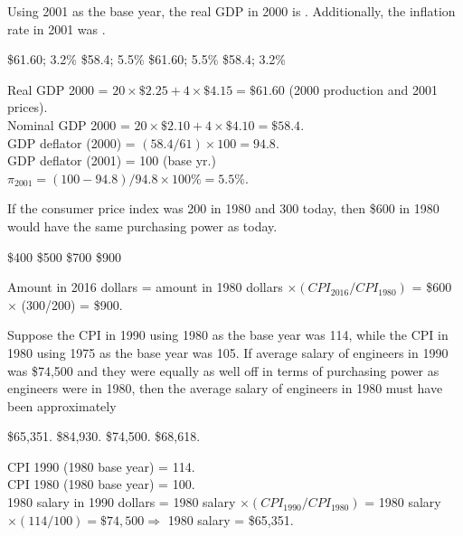 \documentclass[addpoints,11pt]{exam}
\theoremstyle{definition}
\newcommand{\blank}[0]{\underline{\hspace{3cm}}}
\begin{document}
\begin{questions}
			Using 2001 as the base year, the real GDP in 2000 is \blank. Additionally, the inflation rate in 2001 was \blank.
			
			\begin{choices}
				\choice \$61.60; 3.2\%
				\choice \$58.4; 5.5\%
				\CorrectChoice \$61.60; 5.5\%
				\choice \$58.4; 3.2\%
			\end{choices}
			
			\begin{solution}
				Real GDP 2000 = $20 \times \$2.25 + 4 \times \$4.15 = \$61.60$ (2000 production and 2001 prices). \\
				Nominal GDP 2000 = $20 \times \$2.10 + 4\times \$4.10 = \$58.4$. \\ GDP deflator (2000) = $(58.4/61)\times 100 = 94.8$. \\
				GDP deflator (2001) = 100 (base yr.) \\
				$\pi_{2001} = (100-94.8)/94.8\times 100\% = 5.5\%$.
			\end{solution}
			

			\question If the consumer price index was 200 in 1980 and 300 today, then \$600 in 1980 would have the same purchasing power as \blank today.
			
			\begin{choices}
				\choice \$400
				\choice \$500
				\choice \$700
				\CorrectChoice \$900
			\end{choices}
			
		\begin{solution}
			Amount in 2016 dollars = amount in 1980 dollars $\times (CPI_{2016}/CPI_{1980})$ = \$600 $\times$ (300/200) = \$900.
		\end{solution}

		\question Suppose the CPI in 1990 using 1980 as the base year was 114, while the CPI in 1980 using 1975 as the base year was 105. If average salary of engineers in 1990 was \$74,500 and they were equally as well off in terms of purchasing power as engineers were in 1980, then the average salary of engineers in 1980 must have been approximately
		
		\begin{choices}
			\CorrectChoice \$65,351.
			\choice \$84,930.
			\choice \$74,500.
			\choice \$68,618.
		\end{choices}
		
		\begin{solution}
			CPI 1990 (1980 base year) = 114. \\
			CPI 1980 (1980 base year) = 100. \\
			1980 salary in 1990 dollars = 1980 salary $\times (CPI_{1990}/CPI_{1980})$ = 1980 salary $\times (114/100) = \$74,500 \Rightarrow$ 1980 salary = \$65,351. 
		\end{solution}


\end{questions}
\end{document}
